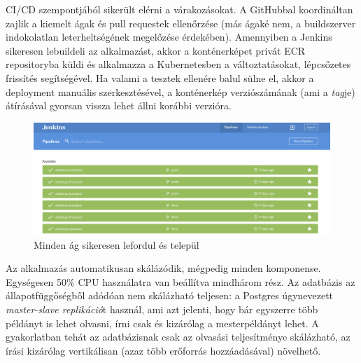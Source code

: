CI/CD szempontjából sikerült elérni a várakozásokat. A GitHubbal koordináltan zajlik a kiemelt ágak és pull requestek ellenőrzése (más ágaké nem, a buildszerver indokolatlan leterheltségének megelőzése érdekében). Amennyiben a Jenkins sikeresen lebuildeli az alkalmazást, akkor a konténerképet privát ECR repositoryba küldi és alkalmazza a Kubernetesben a változtatásokat, lépcsőzetes frissítés segítségével. Ha valami a tesztek ellenére balul sülne el, akkor a deployment manuális szerkesztésével, a konténerkép verziószámának (ami a \textit{tag}je) átírásával gyorsan vissza lehet állni korábbi verzióra.
\begin{figure}[ht]
\centering
\includegraphics[width=150mm, keepaspectratio]{img/jenkinsgreen.png}
\caption{Minden ág sikeresen lefordul és települ}
\end{figure}
\vskip 0.1in
Az alkalmazás automatikusan skálázódik, mégpedig minden komponense. Egységesen 50\% CPU használatra van beállítva mindhárom rész. Az adatbázis az állapotfüggőségből adódóan nem skálázható teljesen: a Postgres úgynevezett \textit{master-slave replikáció}t használ, ami azt jelenti, hogy bár egyszerre több példányt is lehet olvasni, írni csak és kizárólag a mesterpéldányt lehet. A gyakorlatban tehát az adatbázisnak csak az olvasási teljesítménye skálázható, az írási kizárólag vertikálisan (azaz több erőforrás hozzáadásával) növelhető.
\clearpage
